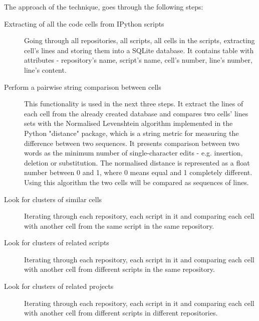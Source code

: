 The approach of the technique, goes through the following steps: 

\begin{description}
\item [Extracting of all the code cells from IPython scripts] 

Going through all repositories, all scripts, all cells in the scripts, extracting cell's lines and storing them into a SQLite database\cite{sqlite3}. It contains table with attributes - repository's name, script's name, cell's number, line's number, line's content.

\item[Perform a pairwise string comparison between cells] 

This functionality is used in the next three steps. It extract the lines of each cell from the already created database and compares two cells' lines sets with the Normalised Levenshtein algorithm implemented in the Python "distance" package\cite{distance}, which is a string metric for measuring the difference between two sequences. It presents comparison between two words as the minimum number of single-character edits - e.g. insertion, deletion or substitution\cite{levenstein}. The normalised distance is represented as a float number between 0 and 1, where 0 means equal and 1 completely different. Using this algorithm the two cells will be compared as sequences of lines.

\item [Look for clusters of similar cells]

Iterating through each repository, each script in it and comparing each cell with another cell from the same script in the same repository. 

\item [Look for clusters of related scripts]

Iterating through each repository, each script in it and comparing each cell with another cell from different scripts in the same repository.

\item [Look for clusters of related projects] 

Iterating through each repository, each script in it and comparing each cell with another cell from different scripts in different repositories. 

\end{description}

